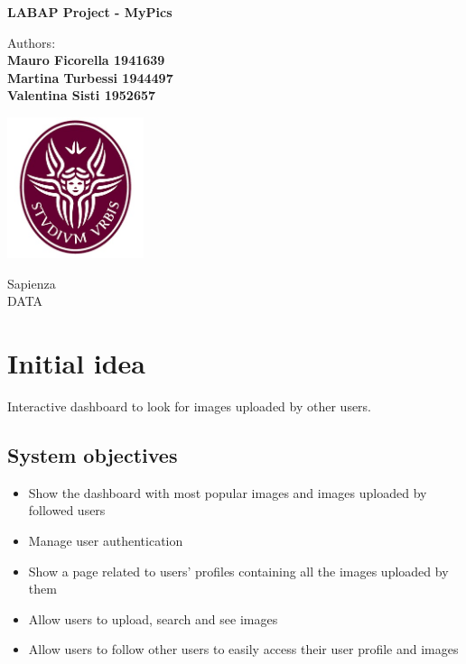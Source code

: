 \documentclass[11pt, a4paper]{article}
\begin{document}
\begin{titlepage}
	\begin{center}
		\vspace*{1cm}
		
		\Huge
		\textbf{LABAP Project - MyPics}
		\vspace{1.5cm}
		
		\Large
		Authors:\\
		\textbf{Mauro Ficorella 1941639}\\
		\textbf{Martina Turbessi 1944497}\\
		\textbf{Valentina Sisti 1952657}\\
		\vspace{0.5cm}
		
		\vfill
		
		\includegraphics[width=0.3\textwidth]{images/Logo.jpg}
		
		\vfill
		
		\vspace{0.8cm}
		
		\Large
		Sapienza\\
		DATA
	\end{center}
\end{titlepage}

\tableofcontents


\newpage

\section{Initial idea}
Interactive dashboard to look for images uploaded by other users.

\subsection{System objectives}
\begin{itemize}
    \item Show the dashboard with most popular images and images uploaded by followed users
    \item Manage user authentication
    \item Show a page related to users’ profiles containing all the images uploaded by them
    \item Allow users to upload, search and see images
    \item Allow users to follow other users to easily access their user profile and images
\end{itemize}
\end{document}
